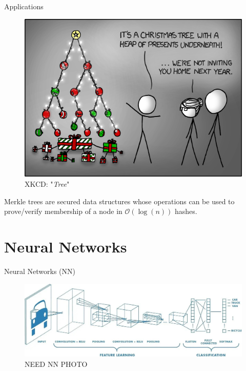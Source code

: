 \documentclass{beamer}
\begin{document}
\begin{frame}{Applications}
	\begin{multicols}{2}
		\begin{figure}
			\includegraphics[width=.45\textwidth]{../Images/xkcd-tree.png}
			\caption{XKCD: "\textit{Tree}" \cite{xkcd-tree}}
		\end{figure}
		
		\columnbreak
		
		\null \vfill
		
		Merkle trees are secured data structures whose operations can be used to prove/verify membership of a node in $\mathcal{O}(\log(n))$ hashes.
		
		\vfill \null
	\end{multicols}
\end{frame}

\section{Neural Networks}

\begin{frame}{Neural Networks (NN)}
	\begin{figure}
		\includegraphics[width=.8\textwidth]{../Images/big-pic-cnn.jpg}
		\caption{NEED NN PHOTO \cite{eli5CNN}}
	\end{figure}
\end{frame}
\end{document}

